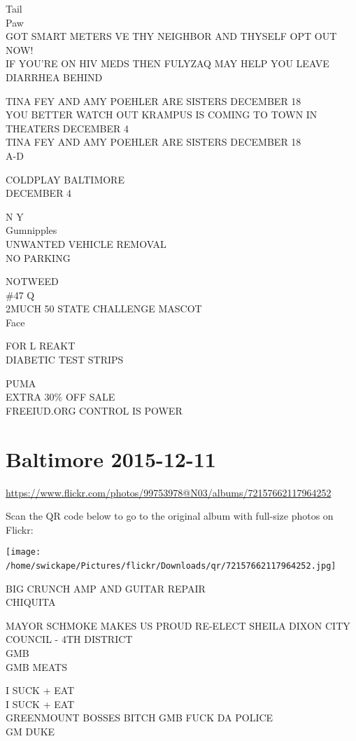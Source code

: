 \documentclass[10pt,letterpaper]{article}
\begin{document}
Tail\\
Paw\\
GOT SMART METERS VE THY NEIGHBOR AND THYSELF OPT OUT NOW!\\
IF YOU'RE ON HIV MEDS THEN FULYZAQ MAY HELP YOU LEAVE DIARRHEA BEHIND

TINA FEY AND AMY POEHLER ARE SISTERS DECEMBER 18\\
YOU BETTER WATCH OUT KRAMPUS IS COMING TO TOWN IN THEATERS DECEMBER 4\\
TINA FEY AND AMY POEHLER ARE SISTERS DECEMBER 18\\
A{-}D

COLDPLAY BALTIMORE\\
DECEMBER 4

N Y\\
Gumnipples\\
UNWANTED VEHICLE REMOVAL\\
NO PARKING

NOTWEED\\
\#47 Q\\
2MUCH 50 STATE CHALLENGE MASCOT\\
Face

FOR L REAKT\\
DIABETIC TEST STRIPS

PUMA\\
EXTRA 30\% OFF SALE\\
FREEIUD.ORG CONTROL IS POWER
\

\section*{Baltimore 2015-12-11}

\url{https://www.flickr.com/photos/99753978@N03/albums/72157662117964252}

Scan the QR code below to go to the original album with full-size photos on Flickr:

\texttt{[image: /home/swickape/Pictures/flickr/Downloads/qr/72157662117964252.jpg]}
\

BIG CRUNCH AMP AND GUITAR REPAIR\\
CHIQUITA

MAYOR SCHMOKE MAKES US PROUD RE{-}ELECT SHEILA DIXON CITY COUNCIL {-} 4TH DISTRICT\\
GMB\\
GMB MEATS

I SUCK + EAT\\
I SUCK + EAT\\
GREENMOUNT BOSSES BITCH GMB FUCK DA POLICE\\
GM DUKE
\end{document}
